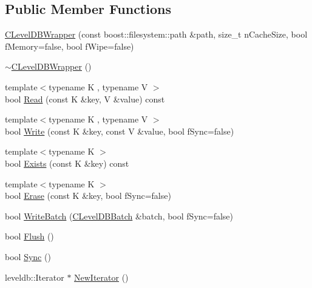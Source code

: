 \subsection*{Public Member Functions}
\begin{DoxyCompactItemize}
\item 
\mbox{\hyperlink{class_c_level_d_b_wrapper_ae796b1190c072df6275e0ada4d187943}{C\+Level\+D\+B\+Wrapper}} (const boost\+::filesystem\+::path \&path, size\+\_\+t n\+Cache\+Size, bool f\+Memory=false, bool f\+Wipe=false)
\item 
\mbox{\hyperlink{class_c_level_d_b_wrapper_a7ffe7edeadfcf521d32509216e95403b}{$\sim$\+C\+Level\+D\+B\+Wrapper}} ()
\item 
{\footnotesize template$<$typename K , typename V $>$ }\\bool \mbox{\hyperlink{class_c_level_d_b_wrapper_a0cb51d3b8f042641b2d0aa76c3185527}{Read}} (const K \&key, V \&value) const
\item 
{\footnotesize template$<$typename K , typename V $>$ }\\bool \mbox{\hyperlink{class_c_level_d_b_wrapper_a740caa1aefbafc888838ea7f70dc31f4}{Write}} (const K \&key, const V \&value, bool f\+Sync=false)
\item 
{\footnotesize template$<$typename K $>$ }\\bool \mbox{\hyperlink{class_c_level_d_b_wrapper_a43c427da8e32af87a09d3cb60353ef0e}{Exists}} (const K \&key) const
\item 
{\footnotesize template$<$typename K $>$ }\\bool \mbox{\hyperlink{class_c_level_d_b_wrapper_a9f67e2880ba191fdc9439ba34e315d72}{Erase}} (const K \&key, bool f\+Sync=false)
\item 
bool \mbox{\hyperlink{class_c_level_d_b_wrapper_a820484c9e427f9e3400396e750acf4b8}{Write\+Batch}} (\mbox{\hyperlink{class_c_level_d_b_batch}{C\+Level\+D\+B\+Batch}} \&batch, bool f\+Sync=false)
\item 
bool \mbox{\hyperlink{class_c_level_d_b_wrapper_a639fbfd6652941a1ab570c202197a32a}{Flush}} ()
\item 
bool \mbox{\hyperlink{class_c_level_d_b_wrapper_abd05e914893cd610e8444871f829d8c9}{Sync}} ()
\item 
leveldb\+::\+Iterator $\ast$ \mbox{\hyperlink{class_c_level_d_b_wrapper_a5f43d01a8a6b26464b875d190e002d74}{New\+Iterator}} ()
\end{DoxyCompactItemize}
